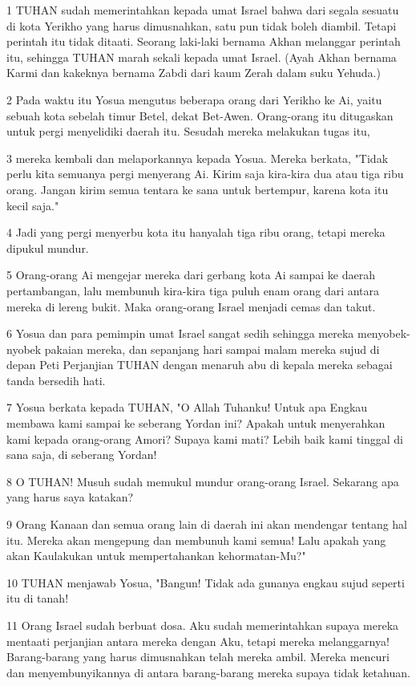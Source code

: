 \par 1 TUHAN sudah memerintahkan kepada umat Israel bahwa dari segala sesuatu di kota Yerikho yang harus dimusnahkan, satu pun tidak boleh diambil. Tetapi perintah itu tidak ditaati. Seorang laki-laki bernama Akhan melanggar perintah itu, sehingga TUHAN marah sekali kepada umat Israel. (Ayah Akhan bernama Karmi dan kakeknya bernama Zabdi dari kaum Zerah dalam suku Yehuda.)
\par 2 Pada waktu itu Yosua mengutus beberapa orang dari Yerikho ke Ai, yaitu sebuah kota sebelah timur Betel, dekat Bet-Awen. Orang-orang itu ditugaskan untuk pergi menyelidiki daerah itu. Sesudah mereka melakukan tugas itu,
\par 3 mereka kembali dan melaporkannya kepada Yosua. Mereka berkata, "Tidak perlu kita semuanya pergi menyerang Ai. Kirim saja kira-kira dua atau tiga ribu orang. Jangan kirim semua tentara ke sana untuk bertempur, karena kota itu kecil saja."
\par 4 Jadi yang pergi menyerbu kota itu hanyalah tiga ribu orang, tetapi mereka dipukul mundur.
\par 5 Orang-orang Ai mengejar mereka dari gerbang kota Ai sampai ke daerah pertambangan, lalu membunuh kira-kira tiga puluh enam orang dari antara mereka di lereng bukit. Maka orang-orang Israel menjadi cemas dan takut.
\par 6 Yosua dan para pemimpin umat Israel sangat sedih sehingga mereka menyobek-nyobek pakaian mereka, dan sepanjang hari sampai malam mereka sujud di depan Peti Perjanjian TUHAN dengan menaruh abu di kepala mereka sebagai tanda bersedih hati.
\par 7 Yosua berkata kepada TUHAN, "O Allah Tuhanku! Untuk apa Engkau membawa kami sampai ke seberang Yordan ini? Apakah untuk menyerahkan kami kepada orang-orang Amori? Supaya kami mati? Lebih baik kami tinggal di sana saja, di seberang Yordan!
\par 8 O TUHAN! Musuh sudah memukul mundur orang-orang Israel. Sekarang apa yang harus saya katakan?
\par 9 Orang Kanaan dan semua orang lain di daerah ini akan mendengar tentang hal itu. Mereka akan mengepung dan membunuh kami semua! Lalu apakah yang akan Kaulakukan untuk mempertahankan kehormatan-Mu?"
\par 10 TUHAN menjawab Yosua, "Bangun! Tidak ada gunanya engkau sujud seperti itu di tanah!
\par 11 Orang Israel sudah berbuat dosa. Aku sudah memerintahkan supaya mereka mentaati perjanjian antara mereka dengan Aku, tetapi mereka melanggarnya! Barang-barang yang harus dimusnahkan telah mereka ambil. Mereka mencuri dan menyembunyikannya di antara barang-barang mereka supaya tidak ketahuan.
